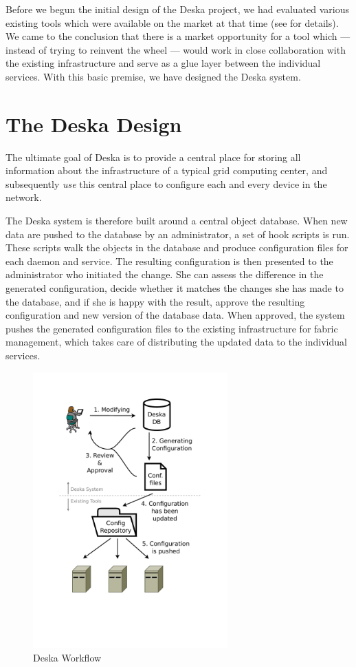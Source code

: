\documentclass[deska]{subfiles}
\begin{document}
Before we begun the initial design of the Deska project, we had evaluated various existing tools which were available
on the market at that time (see  for details).  We came to the conclusion that
there is a market opportunity for a tool which --- instead of trying to reinvent the wheel --- would work in close
collaboration with the existing infrastructure and serve as a glue layer between the individual services.  With this
basic premise, we have designed the Deska system.

\section{The Deska Design}

The ultimate goal of Deska is to provide a central place for storing all information about the infrastructure of a
typical grid computing center, and subsequently {\em use} this central place to configure each and every device in the
network.

The Deska system is therefore built around a central object database.  When new data are pushed to the database by an
administrator, a set of hook scripts is run.  These scripts walk the objects in the database and produce configuration
files for each daemon and service.  The resulting configuration is then presented to the administrator who initiated the
change.  She can assess the difference in the generated configuration, decide whether it matches the changes she has made
to the database, and if she is happy with the result, approve the resulting configuration and new version of the
database data.  When approved, the system pushes the generated configuration files to the existing infrastructure for
fabric management, which takes care of distributing the updated data to the individual services.

\begin{figure}[h]
    \centering
    \includegraphics[trim=28mm 53mm 30mm 28mm, clip=true, width=75mm]{img-deska-workflow.pdf}
    \caption{Deska Workflow}
\end{figure}
\end{document}
